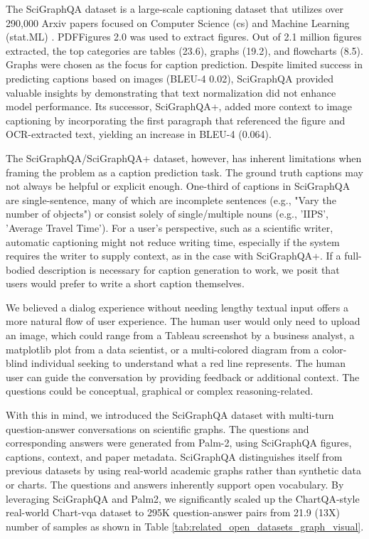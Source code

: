 \documentclass{article}
\begin{document}
The SciGraphQA dataset is a large-scale captioning dataset that utilizes over 290,000 Arxiv papers focused on Computer Science (cs) and Machine Learning (stat.ML) \cite{hsu2021scicap}. PDFFigures 2.0 was used to extract figures. Out of 2.1 million figures extracted, the top categories are tables (23.6), graphs (19.2), and flowcharts (8.5). Graphs were chosen as the focus for caption prediction. Despite limited success in predicting captions based on images (BLEU-4  0.02), SciGraphQA provided valuable insights by demonstrating that text normalization did not enhance model performance. Its successor, SciGraphQA+, added more context to image captioning by incorporating the first paragraph that referenced the figure and OCR-extracted text, yielding an increase in BLEU-4 (0.064).

The SciGraphQA/SciGraphQA+ dataset, however, has inherent limitations when framing the problem as a caption prediction task. The ground truth captions may not always be helpful or explicit enough. One-third of captions in SciGraphQA are single-sentence, many of which are incomplete sentences (e.g., "Vary the number of objects") or consist solely of single/multiple nouns (e.g., 'IIPS', 'Average Travel Time'). For a user's perspective, such as a scientific writer, automatic captioning might not reduce writing time, especially if the system requires the writer to supply context, as in the case with SciGraphQA+. If a full-bodied description is necessary for caption generation to work, we posit that users would prefer to write a short caption themselves.

 We believed a dialog experience without needing lengthy textual input offers a more natural flow of user experience. The human user would only need to upload an image, which could range from a Tableau screenshot by a business analyst, a matplotlib plot from a data scientist, or a multi-colored diagram from a color-blind individual seeking to understand what a red line represents. The human user can guide the conversation by providing feedback or additional context. The questions could be conceptual, graphical or complex reasoning-related. 

With this in mind, we introduced the SciGraphQA dataset with multi-turn question-answer conversations on scientific graphs. The questions and corresponding answers were generated from Palm-2, using SciGraphQA figures, captions, context, and paper metadata. SciGraphQA distinguishes itself from previous datasets by using real-world academic graphs rather than synthetic data or charts. The questions and answers inherently support open vocabulary. By leveraging SciGraphQA and Palm2, we significantly scaled up the ChartQA-style real-world Chart-vqa dataset to 295K question-answer pairs from 21.9 (13X) number of samples as shown in Table \ref{tab:related_open_datasets_graph_visual}. 
\end{document}
